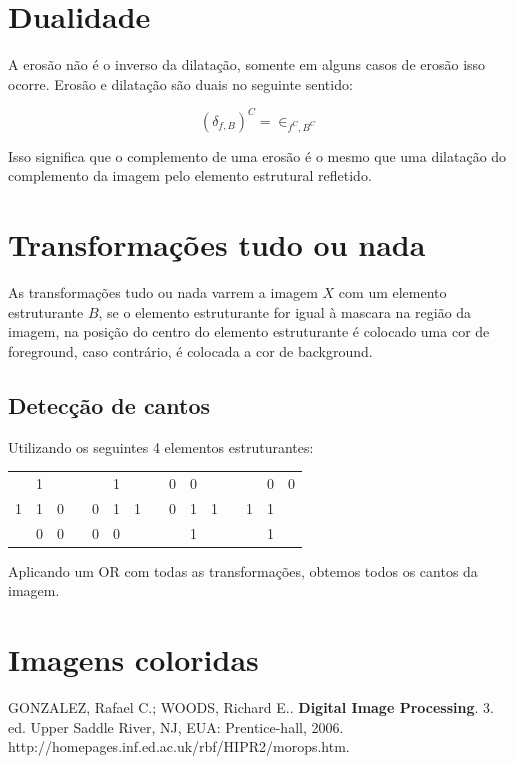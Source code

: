 \documentclass[10pt,a4paper]{article}
\begin{document}
\section{Dualidade}
A erosão não é o inverso da dilatação, somente em alguns casos de
erosão isso ocorre. Erosão e dilatação são duais no seguinte sentido:

\begin{equation}
    (\delta_{f,B})^{C} = \in_{f^{C},B^{C}}
\end{equation}

Isso significa que o complemento de uma erosão é o mesmo que uma dilatação do complemento da imagem pelo elemento estrutural refletido.

\section{Transformações tudo ou nada}
As transformações tudo ou nada varrem a imagem $X$ com um elemento estruturante $B$, se o elemento estruturante for igual à mascara na região da imagem, na posição do centro do elemento estruturante é colocado uma cor de foreground, caso contrário, é colocada a cor de background.

\subsection{Detecção de cantos}
Utilizando os seguintes 4 elementos estruturantes:

\begin{table}[h]
\begin{tabular}{|l|l|l|l|l|l|l|l|l|l|l|l|l|l|l|}
\cline{1-3} \cline{5-7} \cline{9-11} \cline{13-15}
  & 1 &   &  &   & 1 &   &  & 0 & 0 &   &  &   & 0 & 0 \\ \cline{1-3} \cline{5-7} \cline{9-11} \cline{13-15}
1 & 1 & 0 &  & 0 & 1 & 1 &  & 0 & 1 & 1 &  & 1 & 1 &   \\ \cline{1-3} \cline{5-7} \cline{9-11} \cline{13-15}
  & 0 & 0 &  & 0 & 0 &   &  &   & 1 &   &  &   & 1 &   \\ \cline{1-3} \cline{5-7} \cline{9-11} \cline{13-15}
\end{tabular}
\end{table}

Aplicando um OR com todas as transformações, obtemos todos os cantos da imagem.

\section{Imagens coloridas}



\begin{thebibliography}{99}
     GONZALEZ, Rafael C.; WOODS, Richard E.. \textbf{Digital Image Processing}. 3. ed. Upper Saddle River, NJ, EUA: Prentice-hall, 2006.
     http://homepages.inf.ed.ac.uk/rbf/HIPR2/morops.htm.
\end{thebibliography}
\end{document}
